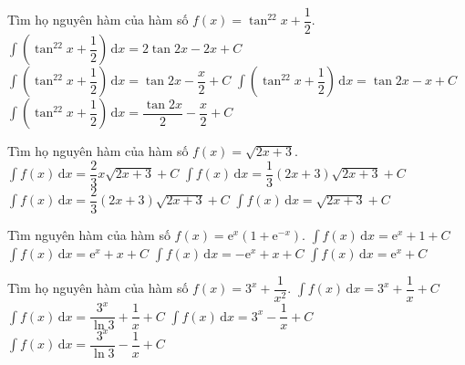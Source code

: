 \begin{ex}%
	Tìm họ nguyên hàm của hàm số $f(x)=\tan^22x+\dfrac{1}{2}$. 
	\choice
	{$\displaystyle\int\left(\tan^22x+\dfrac{1}{2}\right)\mathrm{\,d}x=2\tan 2x-2x+C$}
	{$\displaystyle\int\left(\tan^22x+\dfrac{1}{2}\right)\mathrm{\,d}x=\tan 2x-\dfrac{x}{2}+C$}
	{$\displaystyle\int\left(\tan^22x+\dfrac{1}{2}\right)\mathrm{\,d}x=\tan 2x-x+C$}
	{\True $\displaystyle\int\left(\tan^22x+\dfrac{1}{2}\right)\mathrm{\,d}x=\dfrac{\tan 2x}{2}-\dfrac{x}{2}+C$}
\end{ex}
\begin{ex}%
	Tìm họ nguyên hàm của hàm số $f(x)=\sqrt{2x+3}$. 
	\choice
	{$\displaystyle\int f(x)\mathrm{\,d}x=\dfrac{2}{3}x\sqrt{2x+3}+C$}
	{\True $\displaystyle\int f(x)\mathrm{\,d}x=\dfrac{1}{3}(2x+3)\sqrt{2x+3}+C$}
	{$\displaystyle\int f(x)\mathrm{\,d}x=\dfrac{2}{3}(2x+3)\sqrt{2x+3}+C$}
	{$\displaystyle\int f(x)\mathrm{\,d}x=\sqrt{2x+3}+C$}
\end{ex}
\begin{ex}%
	Tìm nguyên hàm của hàm số $f(x)=\mathrm{e}^x\left(1+\mathrm{e}^{-x}\right)$. 
	\choice
	{$\displaystyle\int f(x)\mathrm{\,d}x=\mathrm{e}^x+1+C$}
	{\True $\displaystyle\int f(x)\mathrm{\,d}x=\mathrm{e}^x+x+C$}
	{$\displaystyle\int f(x)\mathrm{\,d}x=-\mathrm{e}^x+x+C$}
	{$\displaystyle\int f(x)\mathrm{\,d}x=\mathrm{e}^x+C$}
\end{ex}
\begin{ex}%
	Tìm họ nguyên hàm của hàm số $f(x)=3^x+\dfrac{1}{x^2}$. 
	\choice
	{$\displaystyle\int f(x)\mathrm{\,d}x=3^x+\dfrac{1}{x}+C$}
	{$\displaystyle\int f(x)\mathrm{\,d}x=\dfrac{3^x}{\ln 3}+\dfrac{1}{x}+C$}
	{$\displaystyle\int f(x)\mathrm{\,d}x=3^x-\dfrac{1}{x}+C$}
	{\True $\displaystyle\int f(x)\mathrm{\,d}x=\dfrac{3^x}{\ln 3}-\dfrac{1}{x}+C$}
\end{ex}

